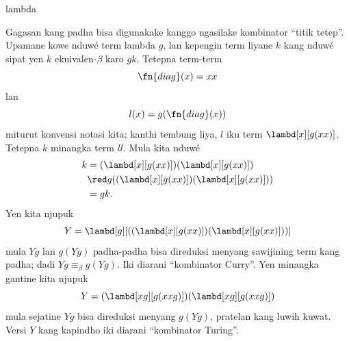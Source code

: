 \documentclass[../../../include/open-logic-section]{subfiles}
\begin{document}
\begin{tagblock}{lambda}
\begin{digress}
Gagasan kang padha bisa digunakake kanggo
ngasilake kombinator ``titik tetep''.
Upamane kowe nduwé term lambda $g$,
lan kepengin term liyane $k$ kang
nduwé sipat yen $k$ ekuivalen-$\beta$
karo $gk$. Tetepna term-term
\[
\fn{diag}(x) = xx
\]
lan
\[
l(x) = g(\fn{diag}(x))
\]
miturut konvensi notasi kita; kanthi
tembung liya, $l$ iku term
$\lambd[x][g(xx)]$. Tetepna $k$
minangka term $ll$. Mula kita nduwé
\begin{align*}
k & = (\lambd[x][g(xx)])(\lambd[x][g(xx)]) \\
& \red  g((\lambd[x][g(xx)])(\lambd[x][g(xx)])) \\
& = gk.
\end{align*}
Yen kita njupuk
\[
Y = \lambd[g][((\lambd[x][g(xx)])(\lambd[x][g(xx)]))]
\]
mula $Yg$ lan $g(Yg)$ padha-padha bisa
direduksi menyang sawijining term kang padha;
dadi $Yg \equiv_\beta
g(Yg)$. Iki diarani ``kombinator Curry''.
Yen minangka gantine kita njupuk
\[
Y = (\lambd[xg][g(xxg)])(\lambd[xg][g(xxg)])
\]
mula sejatine $Yg$ bisa direduksi menyang
$g(Yg)$, pratelan kang luwih kuwat.
Versi $Y$ kang kapindho iki diarani
``kombinator Turing''.
\end{digress}
\end{tagblock}
\end{document}
